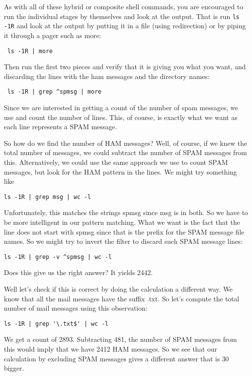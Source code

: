 As with all of these hybrid or composite shell commands, you are
encouraged to run the individual stages by themselves and look at the
output. That is run \verb+ls -1R+ and look at the output by putting it
in a file (using redirection) or by piping it through a pager such as
more:
\begin{verbatim}
 ls -1R | more
\end{verbatim}
Then run the first two pieces and verify that it is giving you what
you want, and discarding the lines with the ham messages and the
directory names:
\begin{verbatim}
 ls -1R | grep ^spmsg | more
\end{verbatim}

Since we are interested in getting a count of the number of spam
messages, we use  and count the number of lines.  This, of course,
is exactly what we want as each line represents a SPAM message.

So how do we find the number of HAM messages?
Well, of course, if we knew the total number of messages, we could
subtract the number of SPAM messages from this.
Alternatively, we could use the same approach we use to count
SPAM messages, but look for the HAM pattern in the lines.
We might try something like
\begin{verbatim}
ls -1R | grep msg | wc -l
\end{verbatim}
Unfortunately, this matches the strings spmsg since msg is in
both. So we have to be more intelligent in our pattern matching.
What we want is the fact that the line does not start with
spmsg since that is the prefix for the SPAM message file names.
So we might try to invert the  filter to discard
such SPAM message lines:
\begin{verbatim}
ls -1R | grep -v ^spmsg | wc -l
\end{verbatim}
Does this give us the right answer?
It yields 2442.

Well let's check if this is correct by doing the calculation a different way.
We know that all the mail messages have the suffix .txt.
So let's compute the total number of mail messages using this
observation:
\begin{verbatim}
ls -1R | grep '\.txt$' | wc -l
\end{verbatim}
We get a count of 2893.
Subtracting 481, the number of SPAM messages from this
would imply that we have 2412 HAM messages.
So we see that our calculation by excluding SPAM
messages gives a different answer that is 30 bigger.

